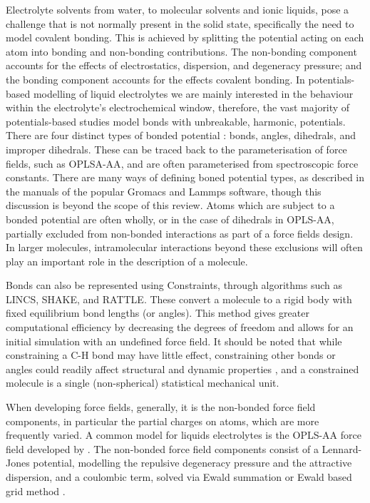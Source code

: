 \documentclass[../main.tex]{subfiles}
\begin{document}
Electrolyte solvents from water, to molecular solvents and ionic liquids, pose a challenge that is not normally present in the solid state, specifically the need to model covalent bonding. This is achieved by splitting the potential acting on each atom into bonding and non-bonding contributions. The non-bonding component accounts for the effects of electrostatics, dispersion, and degeneracy pressure; and the bonding component accounts for the effects covalent bonding. In potentials-based modelling of liquid electrolytes we are mainly interested in the behaviour within the electrolyte's electrochemical window, therefore, the vast majority of potentials-based studies model bonds with unbreakable, harmonic, potentials. There are four distinct types of bonded potential \cite{lindahl_gromacs_2021, frenkel_understanding_2002}: bonds, angles, dihedrals, and improper dihedrals. These can be traced back to the parameterisation of force fields, such as OPLSA-AA\cite{canongia_lopes_clp_2012,jorgensen_development_1996}, and are often parameterised from spectroscopic force constants. There are many ways of defining boned potential types, as described in the manuals of the popular Gromacs\cite{lindahl_gromacs_2021} and Lammps\cite{PLIMPTON19951} software, though this discussion is beyond the scope of this review. Atoms which are subject to a bonded potential are often wholly, or in the case of dihedrals in OPLS-AA, partially excluded from non-bonded interactions as part of a force fields design. In larger molecules, intramolecular interactions beyond these exclusions will often play an important role in the description of a molecule.

Bonds can also be represented using Constraints, through algorithms such as LINCS\cite{hess_lincs_1997}, SHAKE\cite{ryckaert_numerical_1977}, and RATTLE\cite{andersen_rattle_1983}. These convert a molecule to a rigid body with fixed equilibrium bond lengths (or angles). This method gives greater computational efficiency by decreasing the degrees of freedom and allows for an initial simulation with an undefined force field. It should be noted that while constraining a C-H bond may have little effect, constraining other bonds or angles could readily affect structural and dynamic properties \cite{de_wijn_internal_2011, hess_lincs_1997}, and a constrained molecule is a single (non-spherical) statistical mechanical unit.

When developing force fields, generally, it is the non-bonded force field components, in particular the partial charges on atoms, which are more frequently varied. A common model for liquids electrolytes is the OPLS-AA force field developed by \citeauthor{jorgensen_development_1996} \cite{jorgensen_development_1996}. The non-bonded force field components consist of a Lennard-Jones potential, modelling the repulsive degeneracy pressure and the attractive dispersion, and a coulombic term, solved via Ewald summation \cite{ewald_berechnung_1921} or Ewald based grid method \cite{darden_particle_1993,deserno_how_1998,yeh_ewald_1999}.
\end{document}
